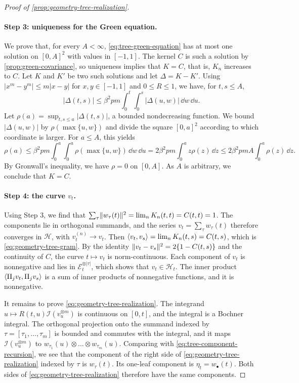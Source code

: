\begin{proof}[Proof of \cref{prop:geometry-tree-realization}]
\paragraph{Step 3: uniqueness for the Green equation.}
We prove that, for every $A<\infty$, \eqref{eq:tree-green-equation} has at most one solution on $[0,A]^2$ with values in $[-1,1]$. The kernel $C$ is such a solution by \cref{prop:green-covariance}, so uniqueness implies that $K=C$, that is, $K_n$ increases to $C$. Let $K$ and $K'$ be two such solutions and let $\Delta=K-K'$. Using $|x^m-y^m|\le m|x-y|$ for $x,y\in[-1,1]$ and $0\le R\le1$, we have, for $t,s\le A$,
\[
 |\Delta(t,s)|\le\beta^2pm\int_0^t\int_0^s|\Delta(u,w)|\,\dd w\,\dd u.
\]
Let $\rho(a)=\sup_{t,s\le a}|\Delta(t,s)|$, a bounded nondecreasing function. We bound $|\Delta(u,w)|$ by $\rho(\max\{u,w\})$ and divide the square $[0,a]^2$ according to which coordinate is larger. For $a\le A$, this yields
\[
 \rho(a)\le\beta^2pm\int_0^a\int_0^a\rho(\max\{u,w\})\,\dd w\,\dd u
 =2\beta^2pm\int_0^az\rho(z)\,\dd z
 \le2\beta^2pmA\int_0^a\rho(z)\,\dd z.
\]
By Gronwall's inequality, we have $\rho=0$ on $[0,A]$. As $A$ is arbitrary, we conclude that $K=C$.

\paragraph{Step 4: the curve $v_t$.}
Using Step 3, we find that $\sum_\tau\lVert w_\tau(t)\rVert^2=\lim_nK_n(t,t)=C(t,t)=1$. The components lie in orthogonal summands, and the series $v_t=\sum_\tau w_\tau(t)$ therefore converges in $\mathcal H$, with $v^{(n)}_t\to v_t$. Then $\left\langle v_t,v_s\right\rangle=\lim_nK_n(t,s)=C(t,s)$, which is \eqref{eq:geometry-tree-gram}. By the identity $\lVert v_t-v_s\rVert^2=2\{1-C(t,s)\}$ and the continuity of $C$, the curve $t\mapsto v_t$ is norm-continuous. Each component of $v_t$ is nonnegative and lies in $\mathcal E_t^{\otimes|\tau|}$, which shows that $v_t\in\mathcal H_t$. The inner product $\left\langle\Pi_jv_t,\Pi_jv_s\right\rangle$ is a sum of inner products of nonnegative functions, and it is nonnegative.

It remains to prove \eqref{eq:geometry-tree-realization}. The integrand $u\mapsto R(t,u)\mathcal I(v_u^{\otimes m})$ is continuous on $[0,t]$, and the integral is a Bochner integral. The orthogonal projection onto the summand indexed by $\tau=[\tau_1,\dots,\tau_m]$ is bounded and commutes with the integral, and it maps $\mathcal I(v_u^{\otimes m})$ to $w_{\tau_1}(u)\otimes\dots\otimes w_{\tau_m}(u)$. Comparing with \eqref{eq:tree-component-recursion}, we see that the component of the right side of \eqref{eq:geometry-tree-realization} indexed by $\tau$ is $w_\tau(t)$. Its one-leaf component is $\eta_t=w_\bullet(t)$. Both sides of \eqref{eq:geometry-tree-realization} therefore have the same components.


\end{proof}
